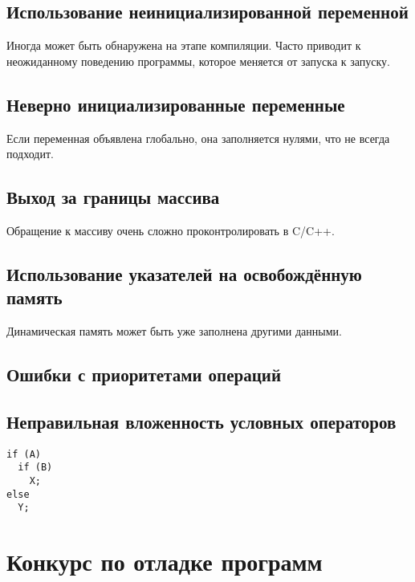 \documentclass[14pt,openany]{book}
\begin{document}
\section{Использование неинициализированной переменной}

Иногда может быть обнаружена на этапе компиляции.
Часто приводит к неожиданному поведению программы, которое меняется от запуска
к запуску. 

\section{Неверно инициализированные переменные}

Если переменная объявлена глобально, она заполняется нулями, что не всегда подходит.

\section{Выход за границы массива}

Обращение к массиву очень сложно проконтролировать в C/C++.

\section{Использование указателей на освобождённую память}

Динамическая память может быть уже заполнена другими данными.

\section{Ошибки с приоритетами операций}

\section{Неправильная вложенность условных операторов}

\begin{lstlisting}
if (A)
  if (B)
    X;
else
  Y;
\end{lstlisting}

\chapter{Конкурс по отладке программ}
\end{document}
